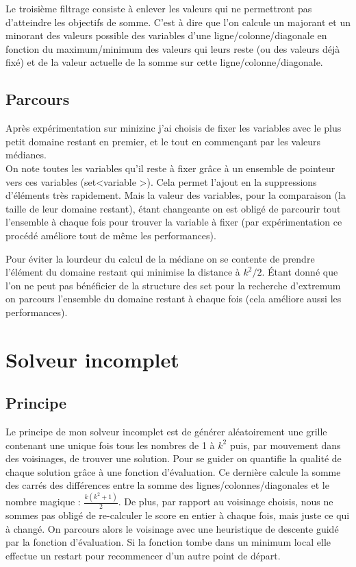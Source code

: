 \documentclass[12pt,a4paper]{article}
\begin{document}
Le troisième filtrage consiste à enlever les valeurs qui ne permettront pas d’atteindre les objectifs de somme. C'est à dire que l'on calcule un majorant et un minorant des valeurs possible des variables d'une ligne/colonne/diagonale en fonction du maximum/minimum des valeurs qui leurs reste (ou des valeurs déjà fixé) et de la valeur actuelle de la somme sur cette ligne/colonne/diagonale.\\


\subsection{Parcours}

Après expérimentation sur minizinc j'ai choisis de fixer les variables avec le plus petit domaine restant en premier, et le tout en commençant par les valeurs médianes.\\

On note toutes les variables qu'il reste à fixer grâce à un ensemble de pointeur vers ces variables (set\textless variable \textgreater). Cela permet l’ajout en la suppressions d'éléments très rapidement. Mais la valeur des variables, pour la comparaison (la taille de leur domaine restant), étant changeante on est obligé de parcourir tout l'ensemble à chaque fois pour trouver la variable à fixer (par expérimentation ce procédé améliore tout de même les performances).

Pour éviter la lourdeur du calcul de la médiane on se contente de prendre l’élément du domaine restant qui minimise la distance à $k^2 /2$. Étant donné que l'on ne peut pas bénéficier de la structure des set pour la recherche d’extremum on parcours l'ensemble du domaine restant à chaque fois (cela améliore aussi les performances).

\section{Solveur incomplet}

\subsection{Principe}

Le principe de mon solveur incomplet est de générer aléatoirement une grille contenant une unique fois tous les nombres de 1 à $k^2$ puis, par mouvement dans des voisinages, de trouver une solution.
Pour se guider on quantifie la qualité de chaque solution grâce à une fonction d'évaluation. Ce dernière calcule la somme des carrés des différences entre la somme des lignes/colonnes/diagonales et le nombre magique : $\frac{ k (k^2 +1)}{2}$. De plus, par rapport au voisinage choisis, nous ne sommes pas obligé de re-calculer le score en entier à chaque fois, mais juste ce qui à changé.
On parcours alors le voisinage avec une heuristique de descente guidé par la fonction d'évaluation. Si la fonction tombe dans un minimum local elle effectue un restart pour recommencer d'un autre point de départ.\\
\end{document}
